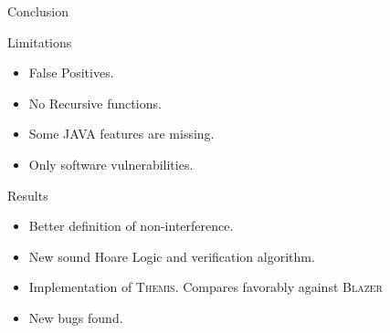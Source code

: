 \documentclass[page number]{beamer}
\begin{document}
\begin{frame}{Conclusion}
  \begin{alertblock}{Limitations}
  \begin{itemize}
  \item False Positives.
  \item No Recursive functions.
  \item Some JAVA features are missing.
  \item Only software vulnerabilities.
  \end{itemize}
  \end{alertblock}
  \vfill
  \begin{exampleblock}{Results}
    \begin{itemize}
    \item Better definition of non-interference.
    \item New sound Hoare Logic and verification algorithm.
    \item Implementation of \textsc{Themis}. Compares favorably against \textsc{Blazer}
    \item New bugs found.
    \end{itemize}
  \end{exampleblock}
\end{frame}
\end{document}
